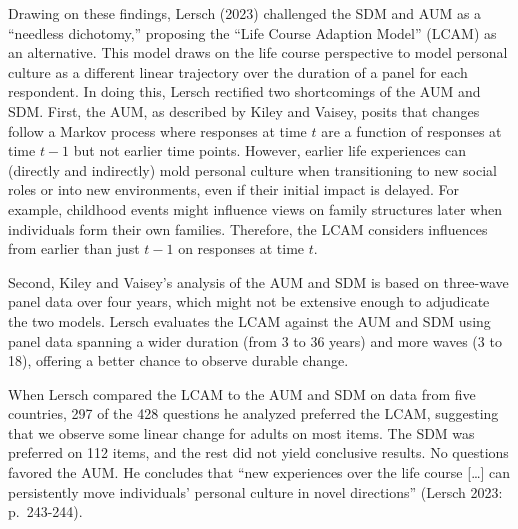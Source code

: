 \documentclass[
  12pt,
]{article}
\begin{document}
Drawing on these findings, Lersch (2023) challenged the SDM and AUM as a
``needless dichotomy,'' proposing the ``Life Course Adaption Model''
(LCAM) as an alternative. This model draws on the life course
perspective to model personal culture as a different linear trajectory
over the duration of a panel for each respondent. In doing this, Lersch
rectified two shortcomings of the AUM and SDM. First, the AUM, as
described by Kiley and Vaisey, posits that changes follow a Markov
process where responses at time \(t\) are a function of responses at
time \(t-1\) but not earlier time points. However, earlier life
experiences can (directly and indirectly) mold personal culture when
transitioning to new social roles or into new environments, even if
their initial impact is delayed. For example, childhood events might
influence views on family structures later when individuals form their
own families. Therefore, the LCAM considers influences from earlier than
just \(t-1\) on responses at time \(t\).

Second, Kiley and Vaisey's analysis of the AUM and SDM is based on
three-wave panel data over four years, which might not be extensive
enough to adjudicate the two models. Lersch evaluates the LCAM against
the AUM and SDM using panel data spanning a wider duration (from 3 to 36
years) and more waves (3 to 18), offering a better chance to observe
durable change.

When Lersch compared the LCAM to the AUM and SDM on data from five
countries, 297 of the 428 questions he analyzed preferred the LCAM,
suggesting that we observe some linear change for adults on most items.
The SDM was preferred on 112 items, and the rest did not yield
conclusive results. No questions favored the AUM. He concludes that
``new experiences over the life course {[}\ldots{]} can persistently
move individuals' personal culture in novel directions'' (Lersch 2023:
p.~243-244).
\end{document}
